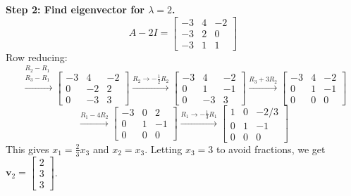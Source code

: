 \documentclass[11pt, a4paper]{article}
\theoremstyle{definition}
\theoremstyle{remark}
\begin{document}
\textbf{Step 2: Find eigenvector for $\lambda = 2$.}
\[
A - 2I = \begin{bmatrix} -3 & 4 & -2 \\ -3 & 2 & 0 \\ -3 & 1 & 1 \end{bmatrix}
\]
Row reducing:
\[
\xrightarrow{\substack{R_2 - R_1 \\ R_3 - R_1}} \begin{bmatrix} -3 & 4 & -2 \\ 0 & -2 & 2 \\ 0 & -3 & 3 \end{bmatrix} \xrightarrow{R_2 \to -\frac{1}{2}R_2} \begin{bmatrix} -3 & 4 & -2 \\ 0 & 1 & -1 \\ 0 & -3 & 3 \end{bmatrix} \xrightarrow{R_3 + 3R_2} \begin{bmatrix} -3 & 4 & -2 \\ 0 & 1 & -1 \\ 0 & 0 & 0 \end{bmatrix}
\]
\[
\xrightarrow{R_1 - 4R_2} \begin{bmatrix} -3 & 0 & 2 \\ 0 & 1 & -1 \\ 0 & 0 & 0 \end{bmatrix} \xrightarrow{R_1 \to -\frac{1}{3}R_1} \begin{bmatrix} 1 & 0 & -2/3 \\ 0 & 1 & -1 \\ 0 & 0 & 0 \end{bmatrix}
\]
This gives $x_1 = \frac{2}{3}x_3$ and $x_2 = x_3$. Letting $x_3 = 3$ to avoid fractions, we get $\mathbf{v}_2 = \begin{bmatrix} 2 \\ 3 \\ 3 \end{bmatrix}$.
\end{document}
